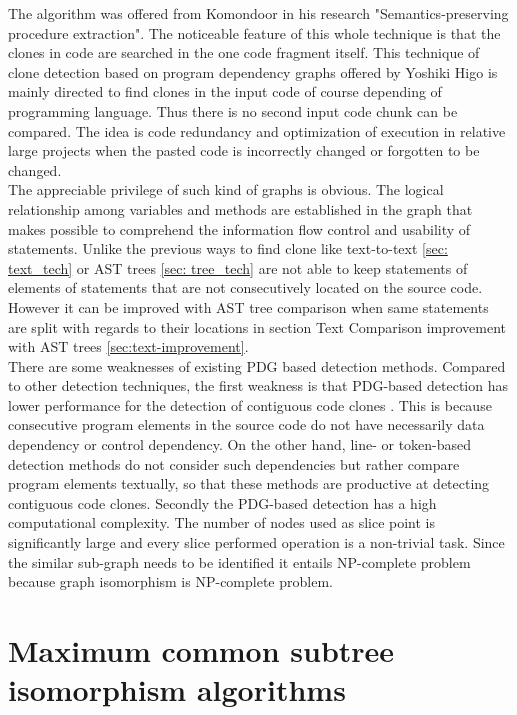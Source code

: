 \documentclass{report}
\begin{document}
The algorithm was offered from Komondoor \cite{Komondoor} in his research "Semantics-preserving procedure extraction". The noticeable feature of this whole technique is that the clones in code are searched in the one code fragment itself. This technique of clone detection based on program dependency graphs offered by Yoshiki Higo \cite{pdg} is mainly directed to find clones in the input code of course depending of programming language. Thus there is no second input code chunk can be compared. The idea is code redundancy and optimization of execution in relative large projects when the pasted code is incorrectly changed or forgotten to be changed.
\\
The appreciable privilege of such kind of graphs is obvious. The logical relationship among variables and methods are established in the graph that makes possible to comprehend the information flow control and usability of statements. Unlike the previous ways to find clone like text-to-text \ref{sec: text_tech} or AST trees \ref{sec: tree_tech} are not able to keep statements of elements of statements that are not consecutively located on the source code. However it can be improved with AST tree comparison when same statements are split with regards to their locations in section Text Comparison improvement with AST trees \ref{sec:text-improvement}.
\\
There are some weaknesses of existing PDG based detection methods. Compared to other detection techniques, the first weakness is that PDG-based detection has lower performance for the detection of contiguous code clones \cite{pdg}. This is because consecutive program elements in the source code do not have necessarily data dependency or control dependency. On the other hand, line- or token-based detection methods do not consider such dependencies but rather compare program elements textually, so that these methods are productive at detecting contiguous code clones. 
Secondly the PDG-based detection has a high computational complexity. The number of nodes used as slice point is significantly large and every slice performed operation is a non-trivial task. Since the similar sub-graph needs to be identified it entails NP-complete problem because graph isomorphism is NP-complete problem.

\chapter{Maximum common subtree isomorphism algorithms}
\label{cha:algorithms-to-compare}
\end{document}
